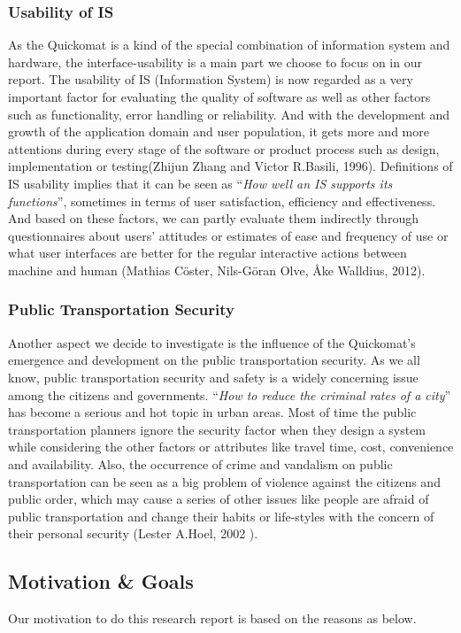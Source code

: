 \documentclass[twocolumn]{article}
\begin{document}
\subsubsection{Usability of IS}
As the Quickomat is a kind of the special combination of information system and hardware, the interface-usability is a main part we choose to focus on in our report. The usability of IS (Information System) is now regarded as a very important factor for evaluating the quality of software as well as other factors such as  functionality, error handling or reliability. And with the development and growth of the application domain and user population, it gets more and more attentions during every stage of the software or product process such as design, implementation or testing(Zhijun Zhang and Victor R.Basili, 1996). Definitions of IS usability implies that it can be seen as  “\emph{How well an IS supports its functions}”, sometimes in terms of user satisfaction, efficiency and effectiveness. And based on these factors, we can partly evaluate them indirectly through questionnaires about users’ attitudes or estimates of ease and frequency of use or what user interfaces are better for the regular interactive actions between machine and human (Mathias Cöster, Nils-Göran Olve, Åke Walldius, 2012).

\subsubsection{Public Transportation Security}
Another aspect we decide to investigate is the influence of the Quickomat’s emergence and development on the public transportation security. As we all know, public transportation security and safety is a widely concerning issue among the citizens and governments. “\emph{How to reduce the criminal rates of a city}” has become a serious and hot topic in urban areas. Most of time the public transportation planners ignore the security factor when they design a system while considering the other factors or attributes like travel time, cost, convenience and availability.  Also, the occurrence of crime and vandalism on public transportation can be seen as a big problem of violence against the citizens and public order, which may cause a series of other issues like people are afraid of public transportation and change their habits or life-styles with the concern of their personal security (Lester A.Hoel, 2002 ). 

\subsection{Motivation \& Goals}
Our motivation to do this research report is based on the reasons as below.
\end{document}
